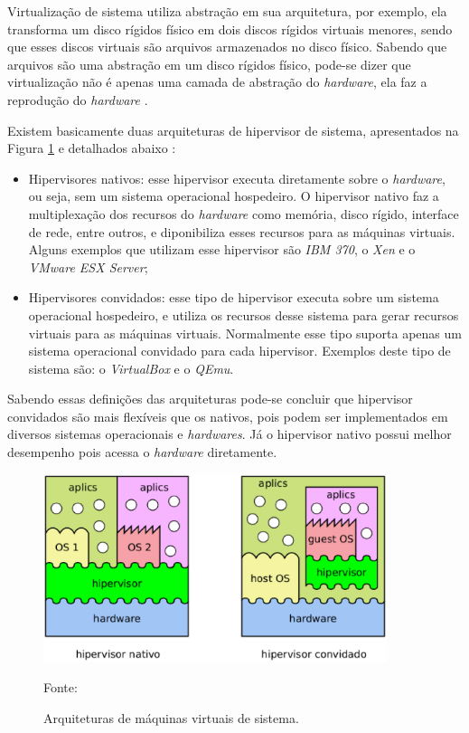 Virtualização de sistema utiliza abstração em sua arquitetura, por exemplo, ela transforma um disco rígidos físico em dois discos rígidos
virtuais menores, sendo que esses discos virtuais são arquivos armazenados no disco físico. Sabendo que arquivos são uma abstração
em um disco rígidos físico, pode-se dizer que virtualização não é apenas uma camada de abstração do \textit{hardware}, ela faz a reprodução 
do \textit{hardware} \cite{smithenair2005}.

Existem basicamente duas arquiteturas de hipervisor de sistema, apresentados na Figura \ref{fig:vms_arquiteturas} e detalhados
abaixo \cite{maziero2013}:
\begin{itemize}
 \item Hipervisores nativos: esse hipervisor executa diretamente sobre o \textit{hardware}, ou seja, sem um sistema operacional
 hospedeiro. O hipervisor nativo faz a multiplexação dos recursos do \textit{hardware} como memória, disco rígido, interface de rede, 
 entre outros, e diponibiliza esses recursos para as máquinas virtuais. Alguns exemplos que utilizam esse hipervisor são 
 \textit{IBM 370}, o \textit{Xen} e o \textit{VMware ESX Server};
 \item Hipervisores convidados: esse tipo de hipervisor executa sobre um sistema operacional hospedeiro, e utiliza os recursos 
 desse sistema para gerar recursos virtuais para as máquinas virtuais. Normalmente esse tipo suporta apenas um sistema 
 operacional convidado para cada hipervisor. Exemplos deste tipo de sistema são: o \textit{VirtualBox} e o \textit{QEmu}.
\end{itemize}

Sabendo essas definições das arquiteturas pode-se concluir que hipervisor convidados são mais flexíveis que os nativos, pois podem ser 
implementados em diversos sistemas operacionais e \textit{hardwares}. Já o hipervisor nativo possui melhor desempenho pois acessa o 
\textit{hardware} diretamente.

\begin{figure}[vms_arquiteturas]
 \centering
 \includegraphics[width=380px]{img/vms_arquiteturas.eps}
 \caption{Arquiteturas de máquinas virtuais de sistema.}
 \label{fig:vms_arquiteturas}
 Fonte: \citet{maziero2013}
\end{figure}

